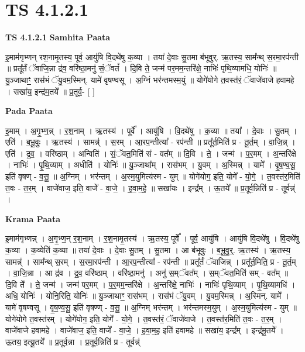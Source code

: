 \documentclass[17pt]{extarticle}
\begin{document}
\section{ TS 4.1.2.1 }

\textbf{TS 4.1.2.1 } \newline
\textbf{Samhita Paata} \newline

इ॒माम॑गृभ्णन् रश॒नामृ॒तस्य॒ पूर्व॒ आयु॑षि वि॒दथे॑षु क॒व्या । तया॑ दे॒वाः सु॒तमा ब॑भूवुर्. ऋ॒तस्य॒ साम᳚न्थ् स॒रमा॒रप॑न्ती ॥ प्रतू᳚र्तं ॅवाजि॒न्ना द्र॑व॒ वरि॑ष्ठा॒मनु॑ सं॒ॅवतं᳚ । दि॒वि ते॒ जन्म॑ पर॒मम॒न्तरि॑क्षे॒ नाभिः॑ पृथि॒व्यामधि॒ योनिः॑ ॥ यु॒ञ्जाथाꣳ॒॒ रास॑भं ॅयु॒वम॒स्मिन्. यामे॑ वृषण्वसू । अ॒ग्निं भर॑न्तमस्म॒युं ॥ योगे॑योगे त॒वस्त॑रं॒ ॅवाजे॑वाजे हवामहे । सखा॑य॒ इन्द्र॑म॒तये᳚ ॥ प्र॒तूर्व॒- [  ] \newline

\textbf{Pada Paata} \newline

इ॒माम् । अ॒गृ॒भ्ण॒न्न् । र॒श॒नाम् । ऋ॒तस्य॑ । पूर्वे᳚ । आयु॑षि । वि॒दथे॑षु । क॒व्या ॥ तया᳚ । दे॒वाः । सु॒तम् । एति॑ । ब॒भू॒वुः॒ । ऋ॒तस्य॑ । सामन्न्॑ । स॒रम् । आ॒रप॒न्तीत्या᳚ - रप॑न्ती ॥ प्रतू᳚र्त॒मिति॑ प्र - तू॒र्त॒म् । वा॒जि॒न्न् । एति॑ । द्र॒व॒ । वरि॑ष्ठाम् । अन्विति॑ । सं॒ॅवत॒मिति॑ सं - वत᳚म् ॥ दि॒वि । ते॒ । जन्म॑ । प॒र॒मम् । अ॒न्तरि॑क्षे । नाभिः॑ । पृ॒थि॒व्याम् । अधीति॑ । योनिः॑ ॥ यु॒ञ्जाथा᳚म् । रास॑भम् । यु॒वम् । अ॒स्मिन्न् । यामे᳚ । वृ॒ष॒ण्व॒सू॒ इति॑ वृषण् - व॒सू॒ ॥ अ॒ग्निम् । भर॑न्तम् । अ॒स्म॒युमित्य॑स्म - युम् ॥ योगे॑योग॒ इति॒ योगे᳚ - यो॒गे॒ । त॒वस्त॑र॒मिति॑ त॒वः - त॒र॒म् । वाजे॑वाज॒ इति॒ वाजे᳚ - वा॒जे॒ । ह॒वा॒म॒हे॒ ॥ सखा॑यः । इन्द्र᳚म् । ऊ॒तये᳚ ॥ प्र॒तूर्व॒न्निति॑ प्र - तूर्वन्न्॑ ।  \newline


\textbf{Krama Paata} \newline

इ॒माम॑गृभ्णन्न् । अ॒गृ॒भ्ण॒न् र॒श॒नाम् । र॒श॒नामृ॒तस्य॑ । ऋ॒तस्य॒ पूर्वे᳚ । पूर्व॒ आयु॑षि । आयु॑षि वि॒दथे॑षु । वि॒दथे॑षु क॒व्या । क॒व्येति॑ क॒व्या ॥ तया॑ दे॒वाः । दे॒वाः सु॒तम् । सु॒तमा । आ ब॑भूवुः । ब॒भू॒वु॒र्॒. ऋ॒तस्य॑ । ऋ॒तस्य॒ सामन्न्॑ । साम᳚न्थ् स॒रम् । स॒रमा॒रप॑न्ती । आ॒रप॒न्तीत्या᳚ - रप॑न्ती ॥ प्रतू᳚र्तं ॅवाजिन्न् । प्रतू᳚र्त॒मिति॒ प्र - तू॒र्त॒म् । वा॒जि॒न्ना । आ द्र॑व । द्र॒व॒ वरि॑ष्ठाम् । वरि॑ष्ठा॒मनु॑ । अनु॑ स॒म्ॅवत᳚म् । स॒म्ॅवत॒मिति॑ सम् - वत᳚म् ॥ दि॒वि ते᳚ । ते॒ जन्म॑ । जन्म॑ पर॒मम् । प॒र॒मम॒न्तरि॑क्षे । अ॒न्तरि॑क्षे॒ नाभिः॑ । नाभिः॑ पृथि॒व्याम् । पृ॒थि॒व्यामधि॑ । अधि॒ योनिः॑ । योनि॒रिति॒ योनिः॑ ॥ यु॒ञ्जाथाꣳ॒॒ रास॑भम् । रास॑भं ॅयु॒वम् । यु॒वम॒स्मिन्न् । अ॒स्मिन्. यामे᳚ । यामे॑ वृषण्वसू । वृ॒ष॒ण्व॒सू॒ इति॑ वृषण्ण् - व॒सू॒ ॥ अ॒ग्निम् भर॑न्तम् । भर॑न्तमस्म॒युम् । अ॒स्म॒युमित्य॑स्म - युम् ॥ योगे॑योगे त॒वस्त॑रम् । योगे॑योग॒ इति॒ योगे᳚ - यो॒गे॒ । त॒वस्त॑रं॒ ॅवाजे॑वाजे । त॒वस्त॑र॒मिति॑ त॒वः - त॒र॒म् । वाजे॑वाजे हवामहे । वाजे॑वाज॒ इति॒ वाजे᳚ - वा॒जे॒ । ह॒वा॒म॒ह॒ इति॑ हवामहे ॥ सखा॑य॒ इन्द्र᳚म् । इन्द्र॑मू॒तये᳚ । ऊ॒तय॒ इत्यू॒तये᳚ ॥ प्र॒तूर्व॒न्ना । प्र॒तूर्व॒न्निति॑ प्र - तूर्वन्न्॑ \newline
\end{document}
